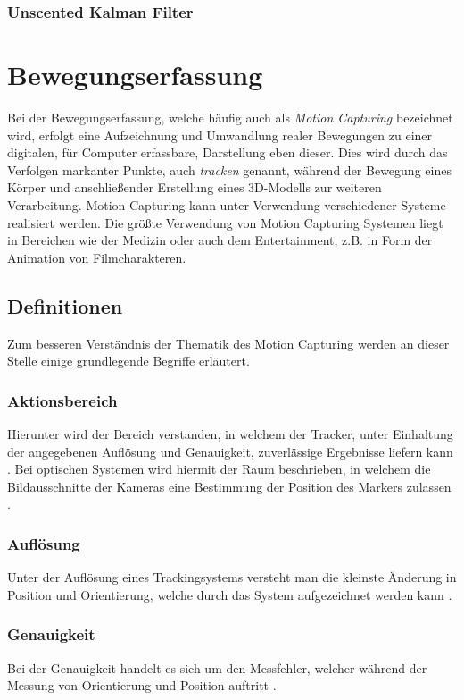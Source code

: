 \subsubsection{Unscented Kalman Filter}


\section{Bewegungserfassung}
Bei der Bewegungserfassung, welche häufig auch als \textit{Motion Capturing} bezeichnet wird, erfolgt eine Aufzeichnung und Umwandlung realer Bewegungen zu einer digitalen, für Computer erfassbare, Darstellung eben dieser.
Dies wird durch das Verfolgen markanter Punkte, auch \textit{tracken} genannt, während der Bewegung eines Körper und anschließender Erstellung eines 3D-Modells zur weiteren Verarbeitung.
Motion Capturing kann unter Verwendung verschiedener Systeme realisiert werden. Die größte Verwendung von Motion Capturing Systemen liegt in Bereichen wie der Medizin oder auch dem Entertainment, z.B. in Form der Animation von Filmcharakteren. \cite{mocap_def}

\subsection{Definitionen}
Zum besseren Verständnis der Thematik des Motion Capturing werden an dieser Stelle einige grundlegende Begriffe erläutert.
\subsubsection{Aktionsbereich}
Hierunter wird der Bereich verstanden, in welchem der Tracker, unter Einhaltung der angegebenen Auflösung und Genauigkeit, zuverlässige Ergebnisse liefern kann \cite{P25}.
Bei optischen Systemen wird hiermit der Raum beschrieben, in welchem die Bildausschnitte der Kameras eine Bestimmung der Position des Markers zulassen \cite{mocap}.
\subsubsection{Auflösung}
Unter der Auflösung eines Trackingsystems versteht man die kleinste Änderung in Position und Orientierung, welche durch das System aufgezeichnet werden kann \cite{P25}.
\subsubsection{Genauigkeit}
Bei der Genauigkeit handelt es sich um den Messfehler, welcher während der Messung von Orientierung und Position auftritt \cite{P25}.
